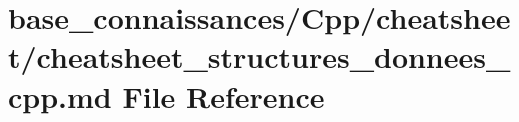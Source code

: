 \hypertarget{base__connaissances_2Cpp_2cheatsheet_2cheatsheet__structures__donnees__cpp_8md}{}\section{base\+\_\+connaissances/\+Cpp/cheatsheet/cheatsheet\+\_\+structures\+\_\+donnees\+\_\+cpp.md File Reference}
\label{base__connaissances_2Cpp_2cheatsheet_2cheatsheet__structures__donnees__cpp_8md}

